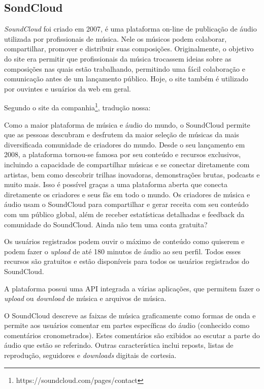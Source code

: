 \subsection{SondCloud}
\textit{SoundCloud} foi criado em 2007, é uma plataforma on-line de publicação de áudio utilizada por profissionais de música. Nele os músicos podem colaborar, compartilhar, promover e distribuir suas composições.
Originalmente, o objetivo do site era permitir que profissionais da música trocassem ideias sobre as composições nas quais estão trabalhando, permitindo uma fácil colaboração e comunicação antes de um lançamento público. Hoje, o site também é utilizado por ouvintes e usuários da web em geral.

Segundo o site da companhia\footnote{https://soundcloud.com/pages/contact}, tradução nossa:

\begin{citacao}
Como a maior plataforma de música e áudio do mundo, o SoundCloud permite que as pessoas descubram e desfrutem da maior seleção de músicas da mais diversificada comunidade de criadores do mundo. Desde o seu lançamento em 2008, a plataforma tornou-se famosa por seu conteúdo e recursos exclusivos, incluindo a capacidade de compartilhar músicas e se conectar diretamente com artistas, bem como descobrir trilhas inovadoras, demonstrações brutas, podcasts e muito mais. Isso é possível graças a uma plataforma aberta que conecta diretamente os criadores e seus fãs em todo o mundo. Os criadores de música e áudio usam o SoundCloud para compartilhar e gerar receita com seu conteúdo com um público global, além de receber estatísticas detalhadas e feedback da comunidade do SoundCloud. Ainda não tem uma conta gratuita? \cite{soundcloud2007}
\end{citacao}

Os usuários registrados podem ouvir o máximo de conteúdo como quiserem e podem fazer o \textit{upload} de até 180 minutos de áudio ao seu perfil. Todos esses recursos são gratuitos e estão disponíveis para todos os usuários registrados do SoundCloud.

A plataforma possui uma API integrada a várias aplicações, que permitem fazer o \textit{upload} ou \textit{download} de música e arquivos de música.

O SoundCloud descreve as faixas de música graficamente como formas de onda e permite aos usuários comentar em partes específicas do áudio (conhecido como comentários cronometrados). Estes comentários são exibidos ao escutar a parte do áudio que estão se referindo. Outras característica inclui reposts, listas de reprodução, seguidores e \textit{downloads} digitais de cortesia.

